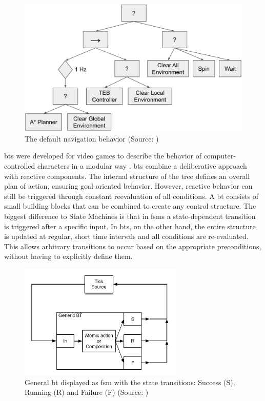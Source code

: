 \begin{figure}[h]
    \centering \captionsetup{justification=centering}
    \includegraphics[width=\textwidth]{figures/20_state_of_the_art/nav2_bt.png}
    \caption[The default navigation behavior]{The default navigation behavior (Source: \cite{macenski_marathon_2020})}
    \label{fig:nav2_bt}
\end{figure}

\Glspl{bt} were developed for video games to describe the behavior of computer-controlled characters in a modular way \cite{hutchison_evolving_2010}. \Glspl{bt} combine a deliberative approach with reactive components. The internal structure of the tree defines an overall plan of action, ensuring goal-oriented behavior. However, reactive behavior can still be triggered through constant reevaluation of all conditions. A \gls{bt} consists of small building blocks that can be combined to create any control structure. The biggest difference to State Machines is that in \glspl{fsm} a state-dependent transition is triggered after a specific input. In \glspl{bt}, on the other hand, the entire structure is updated at regular, short time intervals and all conditions are re-evaluated. This allows arbitrary transitions to occur based on the appropriate preconditions, without having to explicitly define them.

\begin{figure}[h]
    \centering
    \includegraphics[width=0.7\textwidth]{figures/20_state_of_the_art/fsm_general_bt.png}
    \caption[General \gls{bt} displayed as \gls{fsm}]{General \gls{bt} displayed as \gls{fsm} with the state transitions: Success (S), Running (R) and Failure (F) (Source: \cite{colledanchise_behavior_2018})}
    \label{fig:fsm_general_bt}
\end{figure}

